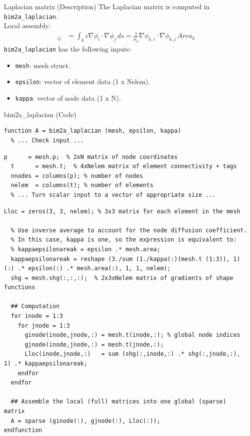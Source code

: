 \documentclass[aspectratio=54,xcolor=dvipsnames]{beamer}
\begin{document}
\begin{frame}{Laplacian matrix (Description)}
    The Laplacian matrix is computed in \texttt{bim2a\_laplacian}. \\
    Local assembly:
    \begin{align*}
        [L^{k}]_{ij} &= \int_{k} \epsilon \nabla \phi_i \cdot \nabla \phi_j \, ds = \frac{1}{\mu_k} \nabla \phi_{k,i} \cdot \nabla \phi_{k,j} \, Area_k
    \end{align*}
    \texttt{bim2a\_laplacian} has the following inputs:
    \begin{itemize}
        \item \texttt{mesh}: mesh struct.
        \item \texttt{epsilon}: vector of element data (1 x Nelem).
        \item \texttt{kappa}: vector of node data (1 x N).
    \end{itemize}

\end{frame}

\begin{frame}[fragile]{bim2a\_laplacian (Code)}
\scriptsize
\begin{lstlisting}[firstnumber=41]
function A = bim2a_laplacian (mesh, epsilon, kappa)
  % ... Check input ...
\end{lstlisting}
\begin{lstlisting}[firstnumber=51]
  p      = mesh.p;  % 2xN matrix of node coordinates
  t      = mesh.t;  % 4xNelem matrix of element connectivity + tags
  nnodes = columns(p); % number of nodes
  nelem  = columns(t); % number of elements
  % ... Turn scalar input to a vector of appropriate size ...
\end{lstlisting}
\begin{lstlisting}[firstnumber=69]
  Lloc = zeros(3, 3, nelem); % 3x3 matrix for each element in the mesh

  % Use inverse average to account for the node diffusion coefficient.
  % In this case, kappa is one, so the expression is equivalent to:
  % kappaepsilonareak = epsilon .* mesh.area;
  kappaepsilonareak = reshape (3./sum (1./kappa(:)(mesh.t (1:3)), 1)(:) .* epsilon(:) .* mesh.area(:), 1, 1, nelem);
  shg = mesh.shg(:,:,:);  % 2x3xNelem matrix of gradients of shape functions
  
  ## Computation
  for inode = 1:3
    for jnode = 1:3
      ginode(inode,jnode,:) = mesh.t(inode,:); % global node indices
      gjnode(inode,jnode,:) = mesh.t(jnode,:);
      Lloc(inode,jnode,:)   = sum (shg(:,inode,:) .* shg(:,jnode,:), 1) .* kappaepsilonareak;
    endfor
  endfor

  ## Assemble the local (full) matrices into one global (sparse) matrix
  A = sparse (ginode(:), gjnode(:), Lloc(:));
endfunction
\end{lstlisting}
\end{frame}
\end{document}
